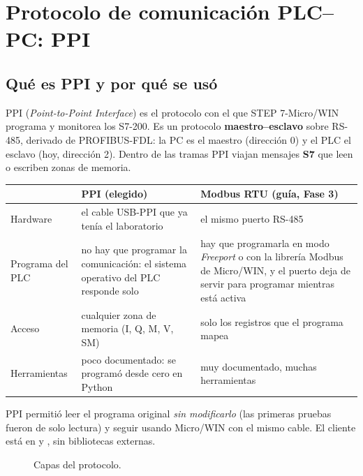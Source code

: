\chapter{Protocolo de comunicación PLC--PC: PPI}\label{cap:ppi}

\section{Qué es PPI y por qué se usó}
PPI (\emph{Point-to-Point Interface}) es el protocolo con el que STEP 7-Micro/WIN programa y monitorea los S7-200. Es un protocolo \textbf{maestro--esclavo} sobre RS-485, derivado de PROFIBUS-FDL: la PC es el maestro (dirección 0) y el PLC el esclavo (hoy, dirección 2). Dentro de las tramas PPI viajan mensajes \textbf{S7} que leen o escriben zonas de memoria.

\begin{center}\small
\begin{tabularx}{\linewidth}{>{\raggedright}p{3.4cm} >{\raggedright}X >{\raggedright\arraybackslash}X}
\toprule
& \textbf{PPI} (elegido) & \textbf{Modbus RTU} (guía, Fase 3)\\
\midrule
Hardware & el cable USB-PPI que ya tenía el laboratorio & el mismo puerto RS-485\\
Programa del PLC & no hay que programar la comunicación: el sistema operativo del PLC responde solo & hay que programarla en modo \emph{Freeport} o con la librería Modbus de Micro/WIN, y el puerto deja de servir para programar mientras está activa\\
Acceso & cualquier zona de memoria (I, Q, M, V, SM) & solo los registros que el programa mapea\\
Herramientas & poco documentado: se programó desde cero en Python & muy documentado, muchas herramientas\\
\bottomrule
\end{tabularx}
\end{center}
PPI permitió leer el programa original \emph{sin modificarlo} (las primeras pruebas fueron de solo lectura) y seguir usando Micro/WIN con el mismo cable. El cliente está en  y , sin bibliotecas externas.

\begin{figure}[H]
\centering
{}
\caption{Capas del protocolo.}
\end{figure}

